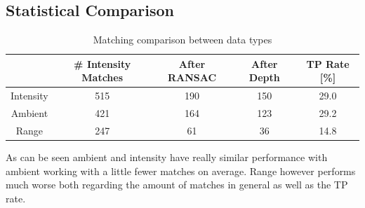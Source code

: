 {    \subsection{Statistical Comparison}{
        \begin{table}[!ht]
            \setlength{\extrarowheight}{10pt}
            \centering
            \begin{tabular}{ccccc}
                & \# Intensity Matches & After RANSAC & After Depth & TP Rate [\%]\\[12pt]
                \hline
                Intensity & 515 & 190 & 150 & 29.0\\[12pt]
                \hline
                Ambient & 421 & 164 & 123 & 29.2\\[12pt]
                \hline
                Range & 247 & 61 & 36 & 14.8\\[12pt]
                \hline
            \end{tabular}
            \caption{Matching comparison between data types}
            \label{tab:matching_data}
        \end{table}

        As can be seen ambient and intensity have really similar performance with ambient working with a little fewer matches on average. Range however performs much worse both regarding the amount of matches in general as well as the TP rate.
    }

}